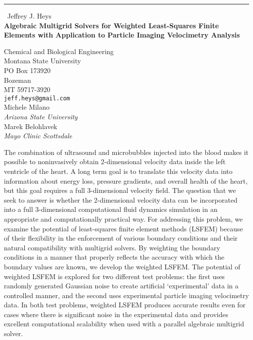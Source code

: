 \documentclass{report}
\begin{document}
\begin{center}
\rule{6in}{1pt} \
{\large Jeffrey J. Heys \\
{\bf Algebraic Multigrid Solvers for Weighted Least-Squares Finite Elements with Application to Particle Imaging Velocimetry Analysis}}

Chemical and Biological Engineering \\ Montana State University \\ PO Box 173920 \\ Bozeman \\ MT 59717-3920
\\
{\tt jeff.heys@gmail.com}\\
Michele Milano\\
{\em Arizona State University}\\
Marek Belohlavek\\
{\em Mayo Clinic Scottsdale}\end{center}

The combination of ultrasound and microbubbles injected into the blood
makes it possible to noninvasively obtain 2-dimensional velocity data
inside the left ventricle of the heart. A long term goal is to translate
this velocity data into information about energy loss, pressure
gradients, and overall health of the heart, but this goal requires a full
3-dimensional velocity field. The question that we seek to answer is
whether the 2-dimensional velocity data can be incorporated into a full
3-dimensional computational fluid dynamics simulation in an appropriate
and computationally practical way. For addressing this problem, we
examine the potential of least-squares finite element methods ({LSFEM})
because of their flexibility in the enforcement of various boundary
conditions and their natural compatibility with multigrid solvers. By
weighting the boundary conditions in a manner that properly reflects the
accuracy with which the boundary values are known, we develop the
weighted LSFEM. The potential of weighted LSFEM is explored for two
different test problems: the first uses randomly generated Gaussian noise
to create artificial `experimental' data in a controlled manner, and the
second uses experimental particle imaging velocimetry data. In both test
problems, weighted LSFEM produces accurate results even for cases where
there is significant noise in the experimental data and provides
excellent computational scalability when used with a parallel algebraic
multigrid solver.
\end{document}
